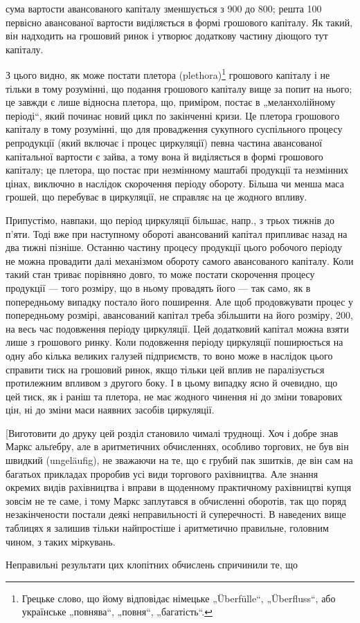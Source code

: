 \parcont{}  %
сума вартости авансованого капіталу зменшується з 900 до
800; решта 100 первісно авансованої вартости виділяється
в формі грошового капіталу. Як такий, він надходить на грошовий
ринок і утворює додаткову частину діющого тут капіталу.

З цього видно, як може постати плетора (plethora)\footnote*{
Грецьке слово, що йому відповідає німецьке „Überfülle“,
„Überfluss“, або українське „повнява“, „повня“, „багатість“. 
} грошового капіталу
і не тільки в тому розумінні, що подання грошового капіталу вище
за попит на нього; це завжди є лише відносна плетора, що, приміром,
постає в „меланхолійному періоді“, який починає новий цикл по
закінченні кризи. Це плетора грошового капіталу в тому розумінні, що
для провадження сукупного суспільного процесу репродукції (який включає
і процес циркуляції) певна частина авансованої капітальної вартости
є зайва, а тому вона й виділяється в формі грошового капіталу; це плетора,
що постає при незмінному маштабі продукції та незмінних цінах,
виключно в наслідок скорочення періоду обороту. Більша чи менша маса
грошей, що перебуває в циркуляції, не справляє на це жодного впливу.

Припустімо, навпаки, що період циркуляції більшає, напр., з трьох
тижнів до п’яти. Тоді вже при наступному обороті авансований капітал
припливає назад на два тижні пізніше. Останню частину процесу продукції
цього робочого періоду не можна провадити далі механізмом обороту
самого авансованого капіталу. Коли такий стан триває порівняно довго,
то може постати скорочення процесу продукції — того розміру, що в
ньому провадять його — так само, як в попередньому випадку постало
його поширення. Але щоб продовжувати процес у попередньому розмірі,
авансований капітал треба збільшити на  його розміру, \deq{} 200, на весь час подовження періоду циркуляції. Цей додатковий капітал
можна взяти лише з грошового ринку. Коли подовження періоду
циркуляції поширюється на одну або кілька великих галузей підприємств,
то воно може в наслідок цього справити тиск на грошовий ринок, якщо
тільки цей вплив не паралізується протилежним впливом з другого боку.
І в цьому випадку ясно й очевидно, що цей тиск, як і раніш та плетора,
не має жодного чинення ні до зміни товарових цін, ні до зміни маси
наявних засобів циркуляції.

[Виготовити до друку цей розділ становило чималі труднощі. Хоч і
добре знав Маркс альґебру, але в аритметичних обчисленнях, особливо
торгових, не був він швидкий (ungeläufig), не зважаючи на те, що є грубий
пак зшитків, де він сам на багатьох прикладах проробив усі види торгового
рахівництва. Але знання окремих видів рахівництва і вправи в
щоденному практичному рахівництві купця зовсім не те саме, і тому
Маркс заплутався в обчисленні оборотів, так що поряд незакінчености
постали деякі неправильності й суперечності. В наведених вище таблицях
я залишив тільки найпростіше і аритметично правильне, головним чином,
з таких міркувань.

Неправильні результати цих клопітних обчислень спричинили те, що
\parbreak{}  %

